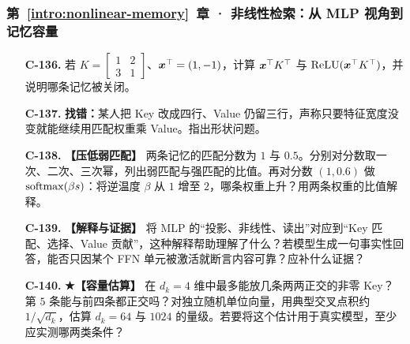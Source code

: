 \subsubsection*{第~\ref*{intro:nonlinear-memory}~章 · 非线性检索：从 MLP 视角到记忆容量}
\begin{enumerate}[label={},leftmargin=4.8em,itemsep=4pt]
\item[\textbf{C-136.}] \leavevmode{}\label{exercise:C-136}\label{exercise:memory-relu-read}若 $K=\begin{bmatrix}1&2\\3&1\end{bmatrix}$、$\boldsymbol{x}^\top=(1,-1)$，计算 $\boldsymbol{x}^\top K^\top$ 与 $\operatorname{ReLU}(\boldsymbol{x}^\top K^\top)$，并说明哪条记忆被关闭。
\item[\textbf{C-137.}] \leavevmode{}\label{exercise:C-137}\label{exercise:memory-pairing-shape}\textbf{找错：}某人把 Key 改成四行、Value 仍留三行，声称只要特征宽度没变就能继续用匹配权重乘 Value。指出形状问题。
\item[\textbf{C-138.}] \leavevmode{}\label{exercise:C-138}\label{exercise:memory-selectivity}\textbf{【压低弱匹配】} 两条记忆的匹配分数为 $1$ 与 $0.5$。分别对分数取一次、二次、三次幂，列出弱匹配与强匹配的比值。再对分数 $(1,0.6)$ 做 $\operatorname{softmax}(\beta s)$：将逆温度 $\beta$ 从 $1$ 增至 $2$，哪条权重上升？用两条权重的比值解释。
\item[\textbf{C-139.}] \leavevmode{}\label{exercise:C-139}\label{exercise:memory-mlp-interpretation}\textbf{【解释与证据】} 将 MLP 的“投影、非线性、读出”对应到“Key 匹配、选择、Value 贡献”，这种解释帮助理解了什么？若模型生成一句事实性回答，能否只因某个 FFN 单元被激活就断言内容可靠？应补什么证据？
\item[\textbf{C-140.}] \leavevmode{}\label{exercise:C-140}\label{exercise:memory-random-capacity}\textbf{{\symboliconfont ★}【容量估算】} 在 $d_k=4$ 维中最多能放几条两两正交的非零 Key？第 $5$ 条能与前四条都正交吗？对独立随机单位向量，用典型交叉点积约 $1/\sqrt{d_k}$，估算 $d_k=64$ 与 $1024$ 的量级。若要将这个估计用于真实模型，至少应实测哪两类条件？
\end{enumerate}
